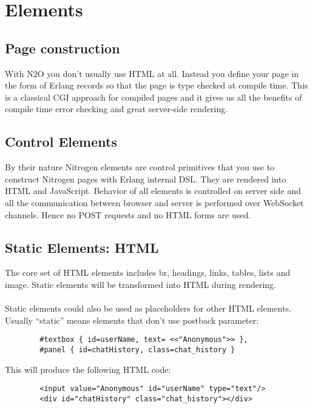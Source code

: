 \section{Elements}

\subsection{Page construction}
With N2O you don't usually use HTML at all. Instead you define your page
in the form of Erlang records so that the page is type checked at compile time.
This is a classical CGI approach for compiled pages and it gives us all the benefits of
compile time error checking and great server-side rendering.

\subsection{Control Elements}
By their nature Nitrogen elements are control primitives
that you use to construct Nitrogen pages with Erlang internal DSL.
They are rendered into HTML and JavaScript.
Behavior of all elements is controlled on server side and all the communication
between browser and server is performed over WebSocket channels.
Hence no POST requests and no HTML forms are used.

\subsection{Static Elements: HTML}
The core set of HTML elements includes br, headings, links, tables, lists and image.
Static elements will be transformed into HTML during rendering.

\paragraph{}
Static elements could also be used as placeholders for other HTML elements.
Usually ``static'' means elements that don't use postback parameter:

\vspace{1\baselineskip}
\begin{lstlisting}
        #textbox { id=userName, text= <<"Anonymous">> },
        #panel { id=chatHistory, class=chat_history }
\end{lstlisting}
\vspace{1\baselineskip}

This will produce the following HTML code:

\vspace{1\baselineskip}
\begin{lstlisting}
        <input value="Anonymous" id="userName" type="text"/>
        <div id="chatHistory" class="chat_history"></div>
\end{lstlisting}
\vspace{1\baselineskip}

